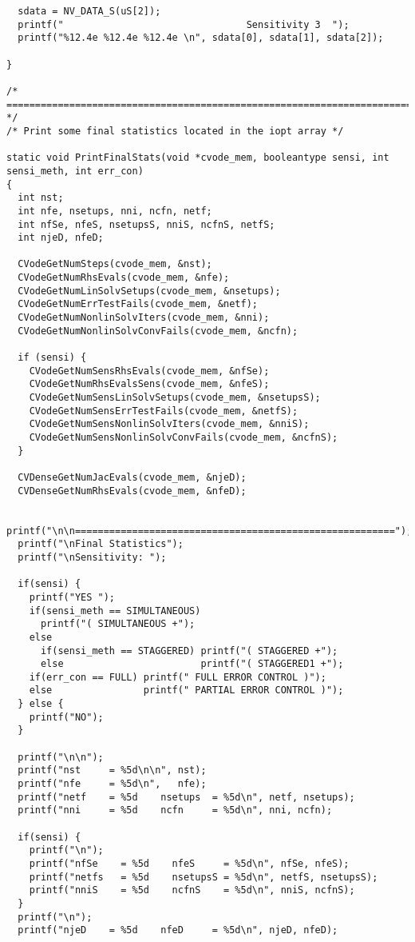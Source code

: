 \begin{verbatim}
  sdata = NV_DATA_S(uS[2]);
  printf("                                Sensitivity 3  ");
  printf("%12.4e %12.4e %12.4e \n", sdata[0], sdata[1], sdata[2]);

}

/* ======================================================================= */
/* Print some final statistics located in the iopt array */

static void PrintFinalStats(void *cvode_mem, booleantype sensi, int sensi_meth, int err_con)
{
  int nst;
  int nfe, nsetups, nni, ncfn, netf;
  int nfSe, nfeS, nsetupsS, nniS, ncfnS, netfS;
  int njeD, nfeD;

  CVodeGetNumSteps(cvode_mem, &nst);
  CVodeGetNumRhsEvals(cvode_mem, &nfe);
  CVodeGetNumLinSolvSetups(cvode_mem, &nsetups);
  CVodeGetNumErrTestFails(cvode_mem, &netf);
  CVodeGetNumNonlinSolvIters(cvode_mem, &nni);
  CVodeGetNumNonlinSolvConvFails(cvode_mem, &ncfn);

  if (sensi) {
    CVodeGetNumSensRhsEvals(cvode_mem, &nfSe);
    CVodeGetNumRhsEvalsSens(cvode_mem, &nfeS);
    CVodeGetNumSensLinSolvSetups(cvode_mem, &nsetupsS);
    CVodeGetNumSensErrTestFails(cvode_mem, &netfS);
    CVodeGetNumSensNonlinSolvIters(cvode_mem, &nniS);
    CVodeGetNumSensNonlinSolvConvFails(cvode_mem, &ncfnS);
  }

  CVDenseGetNumJacEvals(cvode_mem, &njeD);
  CVDenseGetNumRhsEvals(cvode_mem, &nfeD);

  printf("\n\n========================================================");
  printf("\nFinal Statistics");
  printf("\nSensitivity: ");

  if(sensi) {
    printf("YES ");
    if(sensi_meth == SIMULTANEOUS)   
      printf("( SIMULTANEOUS +");
    else 
      if(sensi_meth == STAGGERED) printf("( STAGGERED +");
      else                        printf("( STAGGERED1 +");   
    if(err_con == FULL) printf(" FULL ERROR CONTROL )");
    else                printf(" PARTIAL ERROR CONTROL )");
  } else {
    printf("NO");
  }

  printf("\n\n");
  printf("nst     = %5d\n\n", nst);
  printf("nfe     = %5d\n",   nfe);
  printf("netf    = %5d    nsetups  = %5d\n", netf, nsetups);
  printf("nni     = %5d    ncfn     = %5d\n", nni, ncfn);

  if(sensi) {
    printf("\n");
    printf("nfSe    = %5d    nfeS     = %5d\n", nfSe, nfeS);
    printf("netfs   = %5d    nsetupsS = %5d\n", netfS, nsetupsS);
    printf("nniS    = %5d    ncfnS    = %5d\n", nniS, ncfnS);
  }
  printf("\n");
  printf("njeD    = %5d    nfeD     = %5d\n", njeD, nfeD);


\end{verbatim}
